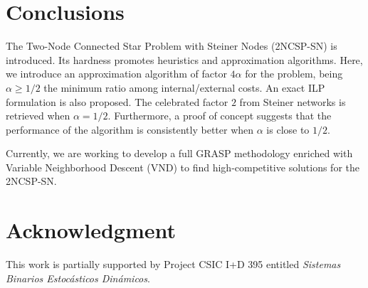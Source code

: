 \documentclass{endm}
\begin{document}
\clearpage 
\section{Conclusions}\label{Conclusions}
The Two-Node Connected Star Problem with Steiner Nodes (2NCSP-SN) is introduced.
Its hardness promotes heuristics and approximation algorithms.
Here, we introduce an approximation algorithm of factor $4\alpha$ for the problem,
being $\alpha \geq 1/2$ the minimum ratio among internal/external costs.
An exact ILP formulation is also proposed.
The celebrated factor $2$ from Steiner networks is retrieved when $\alpha=1/2$.
Furthermore, a proof of concept suggests that the performance of the algorithm is consistently
better when $\alpha$ is close to $1/2$.

Currently, we are working to develop a full GRASP methodology enriched with Variable Neighborhood Descent (VND) to find high-competitive solutions for the 2NCSP-SN.

\section*{Acknowledgment}
This work is partially supported by Project CSIC I+D 395 entitled \emph{Sistemas Binarios
Estoc\'asticos Din\'amicos}.




%

\end{document}
